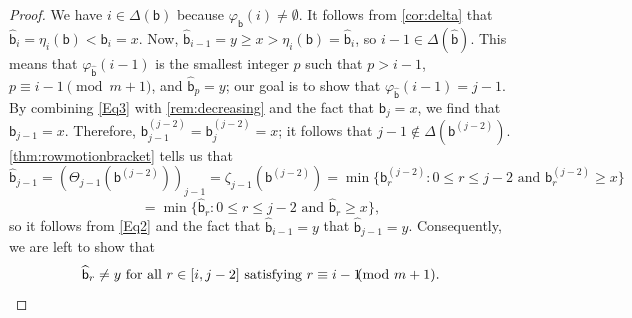 \documentclass[11pt]{amsart}
\theoremstyle{definition}
\begin{document}
\begin{proof}
We have $i\in\Delta(\mathsf b)$ because $\varphi_{\mathsf b}(i)\neq\emptyset$. It follows from \cref{cor:delta} that $\widehat{\mathsf b}_{i}=\eta_{i}(\mathsf b)<\mathsf b_i=x$. Now, $\widehat{\mathsf b}_{i-1}=y\geq x>\eta_i(\mathsf b)=\widehat{\mathsf b}_i$, so $i-1\in\Delta(\widehat{\mathsf b})$. This means that $\varphi_{\widehat{\mathsf b}}(i-1)$ is the smallest integer $p$ such that $p>i-1$, $p\equiv i-1\pmod{m+1}$, and $\widehat{\mathsf b}_p=y$; our goal is to show that $\varphi_{\widehat{\mathsf b}}(i-1)=j-1$. By combining \eqref{Eq3} with \cref{rem:decreasing} and the fact that $\mathsf b_j=x$, we find that $\mathsf b_{j-1}=x$. Therefore, $\mathsf b_{j-1}^{(j-2)}=\mathsf b_j^{(j-2)}=x$; it follows that $j-1\not\in\Delta(\mathsf b^{(j-2)})$.  \cref{thm:rowmotionbracket} tells us that \[\widehat{\mathsf b}_{j-1}=(\Theta_{j-1}(\mathsf b^{(j-2)}))_{j-1}=\zeta_{j-1}(\mathsf b^{(j-2)})=\min\{\mathsf b_r^{(j-2)}:0\leq r\leq j-2\text{ and }\mathsf b_r^{(j-2)}\geq x\}\] \[=\min\{\widehat{\mathsf b}_r:0\leq r\leq j-2\text{ and }\widehat{\mathsf b}_r\geq x\},\] so it follows from \eqref{Eq2} and the fact that $\widehat{\mathsf b}_{i-1}=y$ that $\widehat{\mathsf b}_{j-1}=y$. Consequently, we are left to show that 
\begin{equation}\label{Eq10}
\widehat{\mathsf b}_r\neq y\text{ for all }r\in[i,j-2]\text{ satisfying }r\equiv i-1\hspace{-.25cm}\pmod{m+1}.
\end{equation} 


\end{proof}
\end{document}
